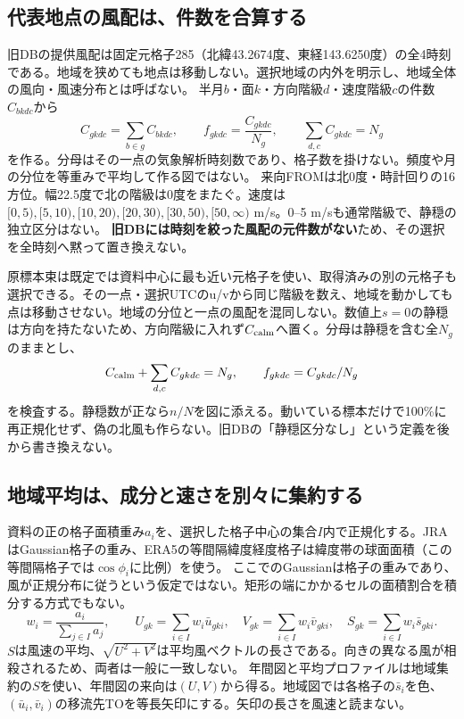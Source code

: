 \documentclass[11pt,a4paper]{article}
\begin{document}
\subsection{代表地点の風配は、件数を合算する}\label{th:climate-rose}
旧DBの提供風配は固定元格子285（北緯43.2674度、東経143.6250度）の全4時刻である。地域を狭めても地点は移動しない。選択地域の内外を明示し、地域全体の風向・風速分布とは呼ばない。
半月$b$・面$k$・方向階級$d$・速度階級$c$の件数$C_{bkdc}$から
\begin{equation}
 C_{gkdc}=\sum_{b\in g}C_{bkdc},\qquad
 f_{gkdc}=\frac{C_{gkdc}}{N_g},\qquad
 \sum_{d,c} C_{gkdc}=N_g
 \label{eq:climate-rose}
\end{equation}
を作る。分母はその一点の気象解析時刻数であり、格子数を掛けない。頻度や月の分位を等重みで平均して作る図ではない。
来向FROMは北0度・時計回りの16方位。幅22.5度で北の階級は0度をまたぐ。速度は$[0,5),[5,10),[10,20),[20,30),[30,50),[50,\infty)$ m/s。0--5 m/sも通常階級で、静穏の独立区分はない。
\textbf{旧DBには時刻を絞った風配の元件数がない}ため、その選択を全時刻へ黙って置き換えない。

原標本束は既定では資料中心に最も近い元格子を使い、取得済みの別の元格子も選択できる。その一点・選択UTCのu/vから同じ階級を数え、地域を動かしても点は移動させない。地域の分位と一点の風配を混同しない。数値上$s=0$の静穏は方向を持たないため、方向階級に入れず$C_{\rm calm}$へ置く。分母は静穏を含む全$N_g$のままとし、
\begin{equation}
 C_{\rm calm}+\sum_{d,c}C_{gkdc}=N_g,\qquad f_{gkdc}=C_{gkdc}/N_g
\end{equation}
を検査する。静穏数が正なら$n/N$を図に添える。動いている標本だけで100\%に再正規化せず、偽の北風も作らない。旧DBの「静穏区分なし」という定義を後から書き換えない。

\clearpage
\subsection{地域平均は、成分と速さを別々に集約する}
資料の正の格子面積重み$a_i$を、選択した格子中心の集合$I$内で正規化する。JRAはGaussian格子の重み、ERA5の等間隔緯度経度格子は緯度帯の球面面積（この等間隔格子では$\cos\phi_i$に比例）を使う。
ここでのGaussianは格子の重みであり、風が正規分布に従うという仮定ではない。矩形の端にかかるセルの面積割合を積分する方式でもない。
\begin{equation}
 w_i=\frac{a_i}{\sum_{j\in I}a_j},\qquad
 U_{gk}=\sum_{i\in I}w_i\bar u_{gki},\quad
 V_{gk}=\sum_{i\in I}w_i\bar v_{gki},\quad
 S_{gk}=\sum_{i\in I}w_i\bar s_{gki}.
 \label{eq:climate-space}
\end{equation}
$S$は風速の平均、$\sqrt{U^2+V^2}$は平均風ベクトルの長さである。向きの異なる風が相殺されるため、両者は一般に一致しない。
年間図と平均プロファイルは地域集約の$S$を使い、年間図の来向は$(U,V)$から得る。地域図では各格子の$\bar s_i$を色、$(\bar u_i,\bar v_i)$の移流先TOを等長矢印にする。矢印の長さを風速と読まない。
\end{document}
